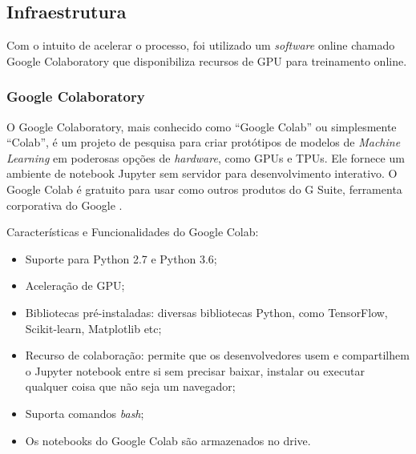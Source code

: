 
\subsection{Infraestrutura}

Com o intuito de acelerar o processo, foi utilizado um \textit{software} online chamado Google Colaboratory que disponibiliza recursos de GPU para treinamento online. 


\subsubsection{Google Colaboratory}
O Google Colaboratory, mais conhecido como \enquote{Google Colab} ou simplesmente \enquote{Colab}, é um projeto de pesquisa para criar protótipos de modelos de \textit{Machine Learning} em poderosas opções de \textit{hardware}, como GPUs e TPUs. Ele fornece um ambiente de notebook Jupyter sem servidor para desenvolvimento interativo. O Google Colab é gratuito para usar como outros produtos do G Suite, ferramenta corporativa do Google \cite{colabdetail}.
 
Características e Funcionalidades do Google Colab:

\begin{itemize}
    \item Suporte para Python 2.7 e Python 3.6;
    \item Aceleração de GPU;
    \item Bibliotecas pré-instaladas: diversas bibliotecas Python, como TensorFlow, Scikit-learn, Matplotlib etc;
    \item Recurso de colaboração: permite que os desenvolvedores usem e compartilhem o Jupyter notebook entre si sem precisar baixar, instalar ou executar qualquer coisa que não seja um navegador;
    \item Suporta comandos \textit{bash};
    \item Os notebooks do Google Colab são armazenados no drive.
\end{itemize}

